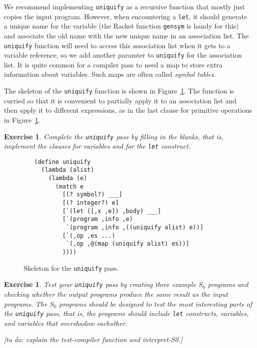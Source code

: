 \documentclass[12pt]{book}
\newtheorem{exercise}[theorem]{Exercise}
\newcommand{\key}[1]{\texttt{#1}}
\begin{document}
We recommend implementing \key{uniquify} as a recursive function that
mostly just copies the input program. However, when encountering a
\key{let}, it should generate a unique name for the variable (the
Racket function \key{gensym} is handy for this) and associate the old
name with the new unique name in an association list. The
\key{uniquify} function will need to access this association list when
it gets to a variable reference, so we add another paramter to
\key{uniquify} for the association list. It is quite common for a
compiler pass to need a map to store extra information about
variables. Such maps are often called \emph{symbol tables}.

The skeleton of the \key{uniquify} function is shown in
Figure~\ref{fig:uniquify-s0}.  The function is curried so that it is
convenient to partially apply it to an association list and then apply
it to different expressions, as in the last clause for primitive
operations in Figure~\ref{fig:uniquify-s0}.

\begin{exercise}
Complete the \key{uniquify} pass by filling in the blanks, that is,
implement the clauses for variables and for the \key{let} construct.
\end{exercise}

\begin{figure}[tbp]
\begin{lstlisting}
   (define uniquify
     (lambda (alist)
       (lambda (e)
         (match e
           [(? symbol?) ___]
           [(? integer?) e]
           [`(let ([,x ,e]) ,body) ___]
           [`(program ,info ,e)
            `(program ,info ,((uniquify alist) e))]
           [`(,op ,es ...)
            `(,op ,@(map (uniquify alist) es))]
           ))))
\end{lstlisting}
\caption{Skeleton for the \key{uniquify} pass.}
\label{fig:uniquify-s0}
\end{figure}

\begin{exercise}
Test your \key{uniquify} pass by creating three example $S_0$ programs
and checking whether the output programs produce the same result as
the input programs. The $S_0$ programs should be designed to test the
most interesting parts of the \key{uniquify} pass, that is, the
programs should include \key{let} constructs, variables, and variables
that overshadow eachother.  

[to do: explain the test-compiler function and interpret-S0.]

\end{exercise}
\end{document}
